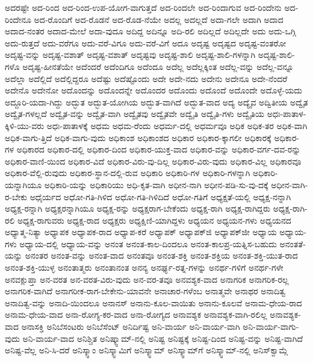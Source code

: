{ಅದರಷ್ಟೇ
ಅದ-ರಿಂದ
ಅದ-ರಿಂದ-ಉಪ-ಯೋಗ-ವಾಗುತ್ತದೆ
ಅದ-ರಿಂದಲೇ
ಅದ-ರಿಂದಾಗುವ
ಅದ-ರಿಂದೇನು
ಅದ-ರಿಂದೇನೂ
ಅದ-ರೊಂದಿಗೆ
ಅದ-ರೊಡನೆ
ಅದ-ರೊಡ-ನೆಯೇ
ಅದಲ್ಲ
ಅದಲ್ಲದೆ
ಅದಾ-ಗಲೇ
ಅದಾಗಿ
ಅದಾದ
ಅದಾದ-ನಂತರ
ಅದಾದ-ಮೇಲೆ
ಅದಾ-ವುದೂ
ಅದಿದ್ದ
ಅದಿನ್ನೂ
ಅದಿ-ರಲಿ
ಅದಿಲ್ಲದೆ
ಅದಿಲ್ಲದೇ
ಅದು
ಅದು-ಒಗ್ಗಿ
ಅದು-ರುತ್ತದೆ
ಅದು-ವರೆಗೂ
ಅದು-ವರೆ-ವಿಗೂ
ಅದು-ವರೆ-ವಿಗೆ
ಅದೂ
ಅದೃಷ್ಟ
ಅದೃಷ್ಟದ
ಅದೃಷ್ಟ-ವಂತರೋ
ಅದೃಷ್ಟ-ವನ್ನು
ಅದೃಷ್ಟ-ವಶಾತ್
ಅದೃಷ್ಟ-ವಶಾತ್‌
ಅದೃಷ್ಟವು
ಅದೃಷ್ಟ-ಶಾಲಿ
ಅದೃಷ್ಟ-ಶಾಲಿ-ಗಳನ್ನಾಗಿ
ಅದೃಷ್ಟ-ಶಾಲಿ-ಗಳೊ
ಅದೃಷ್ಟ-ಹೀನತೆಯೇ
ಅದೆಂದರೆ
ಅದೆಂದಿಗೂ
ಅದೆಂದೂ
ಅದೆಲ್ಲ
ಅದೆಲ್ಲಕ್ಕಿಂತ
ಅದೆಲ್ಲ-ವನ್ನು
ಅದೆಲ್ಲ-ವನ್ನೂ
ಅದೆಲ್ಲಾ
ಅದೆಲ್ಲಿದೆ
ಅದೆಲ್ಲಿದ್ದರೂ
ಅದೆಷ್ಟು
ಅದೆಷ್ಟೊಂದು
ಅದೇ
ಅದೇ-ನದು
ಅದೇನು
ಅದೇನೂ
ಅದೇ-ನೆಂದರೆ
ಅದೇನೊ
ಅದೇನೋ
ಅದೊಂದನ್ನು
ಅದೊಂದನ್ನೇ
ಅದೊಂದರ
ಅದೊಂದು
ಅದೊಂದೆ
ಅದೊಂದೇ
ಅದೊಳ್ಳೆ-ಯದು
ಅದ್ದೂರಿ-ಯದಾ-ಗಿದ್ದು
ಅದ್ಭುತ
ಅದ್ಭುತ-ಯೋಗಿಯ
ಅದ್ಭುತ-ವಾಗಿದೆ
ಅದ್ಭುತ-ವಾದ
ಅದ್ಯ
ಅದ್ಯೈವ
ಅದ್ವಿತೀಯ
ಅದ್ವೈತ
ಅದ್ವೈತ-ಗಳಲ್ಲದೆ
ಅದ್ವೈತ-ವನ್ನು
ಅದ್ವೈತ-ವಾಗಿ
ಅದ್ವೈತವು
ಅದ್ವೈತವೇ
ಅದ್ವೈತಿ
ಅದ್ವೈತಿ-ಗಳು
ಅದ್ವೈತಿಯ
ಅಧಃ-ಪಾತಾಳ-ಕ್ಕಿಳಿ-ಯು-ವರು
ಅಧಃ-ಪಾತಾಳಕ್ಕೆ
ಅಧಮ
ಅಧಮ-ರೆಂದು
ಅಧರ್ಮ-ದಲ್ಲಿ
ಅಧರ್ಮವೂ
ಅಧಿಕ
ಅಧಿಕ-ತರ
ಅಧಿಕ-ವಾಗಿ
ಅಧಿಕ-ವಾಗು-ತ್ತಿದೆ
ಅಧಿಕ-ವಾಗು-ವುದು
ಅಧಿಕಾಂಶ
ಅಧಿಕಾಂಶದ
ಅಧಿಕಾರ
ಅಧಿಕಾರ-ಕ್ಕಾಗಲೀ
ಅಧಿಕಾರಕ್ಕೆ
ಅಧಿಕಾರ-ಗಳ
ಅಧಿಕಾರದ
ಅಧಿಕಾರ-ದಲ್ಲಿ
ಅಧಿಕಾರ-ದಿಂದ
ಅಧಿಕಾರ-ಯುಕ್ತ-ವಾದ
ಅಧಿಕಾರ-ವನ್ನು
ಅಧಿಕಾರ-ವರ್ಗ-ದವ-ರನ್ನು
ಅಧಿಕಾರ-ವಾಣಿ-ಯಿಂದ
ಅಧಿಕಾರ-ವಿದೆ
ಅಧಿಕಾರ-ವಿರು-ವು-ದಿಲ್ಲ
ಅಧಿಕಾರ-ವಿರು-ವುದು
ಅಧಿಕಾರ-ವಿಲ್ಲ
ಅಧಿಕಾರವೂ
ಅಧಿಕಾರ-ವೆಲ್ಲಿ-ರುವುದು
ಅಧಿಕಾರ-ಸ್ಥಾನ-ದಲ್ಲಿ-ರುವ
ಅಧಿಕಾರಿ
ಅಧಿಕಾರಿ-ಗಳ
ಅಧಿಕಾರಿ-ಗಳನ್ನಾಗಿ
ಅಧಿಕಾರಿ-ಯನ್ನಾಗಿಯೂ
ಅಧಿಕಾರಿ-ಯನ್ನು
ಅಧಿಕಾರಿಯು
ಅಧಿ-ಕೃತ-ವಾಗಿ
ಅಧೀನ-ನಾಗಿ
ಅಧೀನ-ಪಡಿ-ಸು-ವು-ದಕ್ಕೆ
ಅಧೀನ-ವಾಗಿ-ರ-ಬೇಕು
ಅಧೈರ್ಯದ
ಅಧೋ-ಗತಿ-ಗಿಳಿದ
ಅಧೋ-ಗತಿ-ಗಿಳಿದಿದೆ
ಅಧೋ-ಗತಿಗೆ
ಅಧ್ಯಕ್ಷತೆ-ಯಲ್ಲಿ
ಅಧ್ಯಕ್ಷ-ನನ್ನಾಗಿ
ಅಧ್ಯಕ್ಷ-ರನ್ನಾಗಿ
ಅಧ್ಯಕ್ಷರನ್ನಾಗಿಯೂ
ಅಧ್ಯಕ್ಷ-ರನ್ನು
ಅಧ್ಯಕ್ಷರಾಗ-ಬೇಕೆಂದು
ಅಧ್ಯಕ್ಷ-ರಾಗಿ
ಅಧ್ಯಕ್ಷ-ರಾಗಿದ್ದರು
ಅಧ್ಯಕ್ಷ-ರಾಗಿ-ರಲಿ
ಅಧ್ಯಕ್ಷ-ರಾಗುವರು
ಅಧ್ಯಕ್ಷ-ರಾದ
ಅಧ್ಯಕ್ಷರು
ಅಧ್ಯಕ್ಷಿಣಿ-ಯಾಗಿದ್ದಳು
ಅಧ್ಯಯನ
ಅಧ್ಯಯನ-ಗಳು
ಅಧ್ಯಯನದ
ಅಧ್ಯಾತ್ಮ-ನಿತ್ಯಾ
ಅಧ್ಯಾಪಕ
ಅಧ್ಯಾಪಕ-ರಾದ
ಅಧ್ಯಾಪ-ಕರೆ
ಅಧ್ಯಾಪಕ್
ಅಧ್ಯಾಪಕ್‌ಜಿ
ಅಧ್ಯಾಪಕ್‌ಜೀ
ಅಧ್ಯಾಯ
ಅಧ್ಯಾಯ-ಗಳು
ಅಧ್ಯಾಯ-ದಲ್ಲಿ
ಅಧ್ಯಾಯ-ವನ್ನು
ಅನಂತ
ಅನಂತ-ಕಾಲ-ದಿಂದಲೂ
ಅನಂತ-ಕಾಲಪ್ರ-ಯತ್ನಿಸ-ಬಹುದು
ಅನಂತತೆ-ಯನ್ನು
ಅನಂತರ
ಅನಂತ-ವನ್ನು
ಅನಂತ-ವಾದ
ಅನಂತವೂ
ಅನಂತ-ಶಕ್ತಿ
ಅನಂತ-ಶಕ್ತಿಯ
ಅನಂತ-ಶಕ್ತಿ-ಯುತ-ರಾದ
ಅನಂತ-ಶಕ್ತಿ-ಯುಳ್ಳ
ಅನಂತಾತ್ಮರು
ಅನಂತಾನಂತ
ಅನನ್ಯ
ಅನರ್ಘ್ಯ-ರತ್ನ-ಗಳನ್ನು
ಅನರ್ಥ-ಗಳಿಗೆ
ಅನರ್ಥ-ಗಳೇ
ಅನವಕ್ಲುಪ್ತಾ
ಅನ-ವರತ
ಅನ-ವರತ-ವಿರು-ವುದು
ಅನ-ವರ-ತವೂ
ಅನವಶ್ಯಕ-ವಾದ
ಅನಾಗರಿಕ
ಅನಾಗರಿಕ-ರಲ್ಲ
ಅನಾಗರಿಕ-ವಾಗಿದೆ
ಅನಾಗರೀಕ-ರಾಗ-ಬೇಕೇನು-ಯಾವನೇ
ಅನಾಚಾರ-ಗಳೆಂಬ
ಅನಾತ್ಮವೇ
ಅನಾಥರ
ಅನಾದಿತ್ವ
ಅನಾದಿತ್ವ-ವನ್ನು
ಅನಾದಿ-ಯಿಂದಲೂ
ಅನಾನಸ್
ಅನಾನು-ಕೂಲ-ವಾಯಿತು
ಅನಾನು-ಕೂಲವೆ
ಅನಾಮ-ಧೇಯ-ರಾದ
ಅನಾಮ-ಧೇಯ-ವಾದ
ಅನಾ-ರೋಗ್ಯ-ಕರ-ವಾದ
ಅನಾ-ರೋಗ್ಯದ
ಅನಾವಶ್ಯಕ
ಅನಾವಶ್ಯಕ-ವಾಗಿ-ರಲಿಲ್ಲ
ಅನಾವಶ್ಯಕ-ವಾದ
ಅನಾಸಕ್ತಿ
ಅನಿಬೆಸಂಟರು
ಅನಿಬೆಸೆಂಟ್
ಅನಿರ್ದಿಷ್ಟ
ಅನಿ-ವಾರ್ಯ
ಅನಿ-ವಾರ್ಯ-ವಾಗಿ
ಅನಿ-ವಾರ್ಯ-ವಾಗು-ವುದು
ಅನಿ-ವಾರ್ಯ-ವಾದ
ಅನಿಶ್ಚಿತ
ಅನಿಷ್ಕ್ವಾಮ್‌-ನಲ್ಲಿ
ಅನಿಷ್ಟ
ಅನಿಷ್ಟಕ್ಕೆ
ಅನಿಷ್ಟ-ದಿಂದ
ಅನಿಷ್ಟ-ವನ್ನು
ಅನಿಷ್ಟ-ವಾಗಿದೆ
ಅನಿಷ್ಟ-ವೆಲ್ಲ
ಅನಿ-ಸಿ-ದರೆ
ಅನಿಸ್ಕ್ವಾಂ
ಅನಿಸ್ಕ್ವಾಮಿಗೆ
ಅನಿಸ್ಕ್ವಾಮ್
ಅನಿಸ್ಕ್ವಾಮ್‌ಗೆ
ಅನಿಸ್ಕ್ವಾಮ್‌-ನಲ್ಲಿ
ಅನಿಸ್‌ಕ್ವಾಮ್ಗೆ
}
